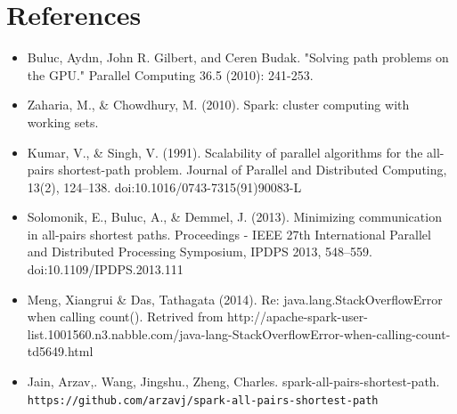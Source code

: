 \documentclass{article} %
\begin{document}
\section{References}
\begin{itemize}
\item Buluc, Aydın, John R. Gilbert, and Ceren Budak. "Solving path problems on the GPU." Parallel Computing 36.5 (2010): 241-253.
\item Zaharia, M., \& Chowdhury, M. (2010). Spark: cluster computing with working sets.
\item Kumar, V., \& Singh, V. (1991). Scalability of parallel algorithms for the all-pairs shortest-path problem. Journal of Parallel and Distributed Computing, 13(2), 124–138. doi:10.1016/0743-7315(91)90083-L
\item Solomonik, E., Buluc, A., \& Demmel, J. (2013). Minimizing communication in all-pairs shortest paths. Proceedings - IEEE 27th International Parallel and Distributed Processing Symposium, IPDPS 2013, 548–559. doi:10.1109/IPDPS.2013.111
\item Meng, Xiangrui \& Das, Tathagata (2014). Re: java.lang.StackOverflowError when calling count(). Retrived from http://apache-spark-user-list.1001560.n3.nabble.com/java-lang-StackOverflowError-when-calling-count-td5649.html
\item Jain, Arzav,. Wang, Jingshu., Zheng, Charles. spark-all-pairs-shortest-path. 
{\tt https://github.com/arzavj/spark-all-pairs-shortest-path}
\end{itemize}
\end{document}
